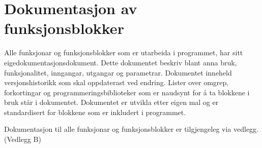\section{Dokumentasjon av funksjonsblokker}
\thispagestyle{fancy}

Alle funksjonar og funksjonsblokker som er utarbeida i programmet, har sitt eige\newline dokumentasjonsdokument.
Dette dokumentet beskriv blant anna bruk, funksjonalitet, inngangar, utgangar og parametrar.
Dokumentet inneheld versjonshistorikk som skal oppdaterast ved endring.
Lister over omgrep, forkortingar og programmeringsbiblioteker som er naudsynt for å ta blokkene i bruk står i dokumentet.
Dokumentet er utvikla etter eigen mal og er standardisert for blokkene som er inkludert i programmet.

Dokumentasjon til alle funksjonar og funksjonsblokker er tilgjengeleg via vedlegg. (Vedlegg B)